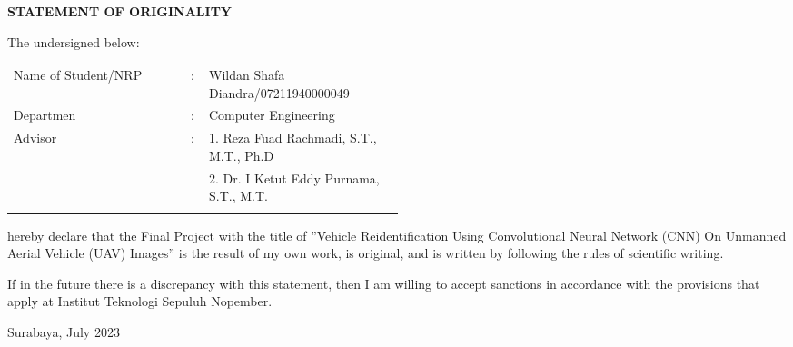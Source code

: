 \begin{center}
  \large
  \textbf{STATEMENT OF ORIGINALITY}
\end{center}

\thispagestyle{empty}

\vspace{2ex}

\noindent
The undersigned below:

\vspace{2ex}

\begin{adjustwidth}{0.5cm}{}
  \begin{tabular}{lcp{0.5\linewidth}}

    Name of Student/NRP & : & Wildan Shafa Diandra/07211940000049     \\

    Departmen           & : & Computer Engineering                    \\

    Advisor             & : & 1. Reza Fuad Rachmadi, S.T., M.T., Ph.D \\
                        &   & 2. Dr. I Ketut Eddy Purnama, S.T., M.T. \\                                                        \\
  \end{tabular}
\end{adjustwidth}


hereby declare that the Final Project with the title of ”Vehicle Reidentification Using Convolutional Neural Network (CNN) On Unmanned Aerial Vehicle (UAV) Images” is the result of my own work, is original, and is written by following the rules of scientific writing.

If in the future there is a discrepancy with this statement, then I am willing to accept sanctions in accordance with the provisions that apply at Institut Teknologi Sepuluh Nopember.

\vspace{2ex}

\begin{flushright}
  Surabaya, July 2023
\end{flushright}

